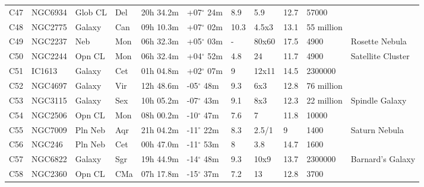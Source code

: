 \begin{longtable}{@{}lllllllllll@{}}
C47        & NGC6934     & Glob CL    & Del       & 20h 34.2m & +07$^{\circ}$ 24m  & 8.9       & 5.9                  & 12.7     & 57000               &                                 \\
C48        & NGC2775     & Galaxy     & Can       & 09h 10.3m & +07$^{\circ}$ 02m  & 10.3      & 4.5x3                & 13.1     & 55 million          &                                 \\
C49        & NGC2237    & Neb        & Mon       & 06h 32.3m & +05$^{\circ}$ 03m  & -         & 80x60                & 17.5     & 4900                & Rosette Nebula                  \\
C50        & NGC2244     & Opn CL     & Mon       & 06h 32.4m & +04$^{\circ}$ 52m  & 4.8       & 24                   & 11.7     & 4900                & Satellite Cluster               \\
C51        & IC1613      & Galaxy     & Cet       & 01h 04.8m & +02$^{\circ}$ 07m  & 9         & 12x11                & 14.5     & 2300000             &                                 \\
C52        & NGC4697     & Galaxy     & Vir       & 12h 48.6m & -05$^{\circ}$ 48m  & 9.3       & 6x3                  & 12.8     & 76 million          &                                 \\
C53        & NGC3115     & Galaxy     & Sex       & 10h 05.2m & -07$^{\circ}$ 43m  & 9.1       & 8x3                  & 12.3     & 22 million          & Spindle Galaxy                  \\
C54        & NGC2506     & Opn CL     & Mon       & 08h 00.2m & -10$^{\circ}$ 47m  & 7.6       & 7                    & 11.8     & 10000               &                                 \\
C55        & NGC7009     & Pln Neb    & Aqr       & 21h 04.2m & -11$^{\circ}$ 22m  & 8.3       & 2.5/1                & 9        & 1400                & Saturn Nebula                   \\
C56        & NGC246      & Pln Neb    & Cet       & 00h 47.0m & -11$^{\circ}$ 53m  & 8         & 3.8                  & 14.7     & 1600                &                                 \\
C57        & NGC6822     & Galaxy     & Sgr       & 19h 44.9m & -14$^{\circ}$ 48m  & 9.3       & 10x9                 & 13.7     & 2300000             & Barnard's Galaxy                \\
C58        & NGC2360     & Opn CL     & CMa       & 07h 17.8m & -15$^{\circ}$ 37m  & 7.2       & 13                   & 12.8     & 3700                &                                 \\

\end{longtable}
